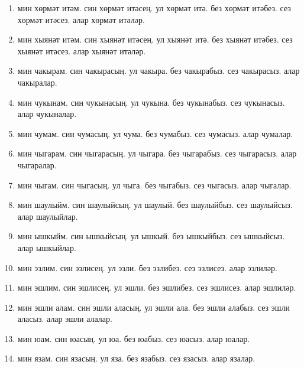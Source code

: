 \documentclass{article}
\begin{document}
\begin{enumerate}
    \item
    мин хөрмәт итәм.
    син хөрмәт итәсең.
    ул хөрмәт итә.
    без хөрмәт итәбез.
    сез хөрмәт итәсез.
    алар хөрмәт итәләр.

    \item
    мин хыянәт итәм.
    син хыянәт итәсең.
    ул хыянәт итә.
    без хыянәт итәбез.
    сез хыянәт итәсез.
    алар хыянәт итәләр.

    \item
    мин чакырам.
    син чакырасың.
    ул чакыра.
    без чакырабыз.
    сез чакырасыз.
    алар чакыралар.

    \item
    мин чукынам.
    син чукынасың.
    ул чукына.
    без чукынабыз.
    сез чукынасыз.
    алар чукыналар.

    \item
    мин чумам.
    син чумасың.
    ул чума.
    без чумабыз.
    сез чумасыз.
    алар чумалар.

    \item
    мин чыгарам.
    син чыгарасың.
    ул чыгара.
    без чыгарабыз.
    сез чыгарасыз.
    алар чыгаралар.

    \item
    мин чыгам.
    син чыгасың.
    ул чыга.
    без чыгабыз.
    сез чыгасыз.
    алар чыгалар.

    \item
    мин шаулыйм.
    син шаулыйсың.
    ул шаулый.
    без шаулыйбыз.
    сез шаулыйсыз.
    алар шаулыйлар.

    \item
    мин ышкыйм.
    син ышкыйсың.
    ул ышкый.
    без ышкыйбыз.
    сез ышкыйсыз.
    алар ышкыйлар.

    \item
    мин эзлим.
    син эзлисең.
    ул эзли.
    без эзлибез.
    сез эзлисез.
    алар эзлиләр.

    \item
    мин эшлим.
    син эшлисең.
    ул эшли.
    без эшлибез.
    сез эшлисез.
    алар эшлиләр.

    \item
    мин эшли алам.
    син эшли аласың.
    ул эшли ала.
    без эшли алабыз.
    сез эшли аласыз.
    алар эшли алалар.

    \item
    мин юам.
    син юасың.
    ул юа.
    без юабыз.
    сез юасыз.
    алар юалар.

    \item
    мин язам.
    син язасың.
    ул яза.
    без язабыз.
    сез язасыз.
    алар язалар.


\end{enumerate}
\end{document}
